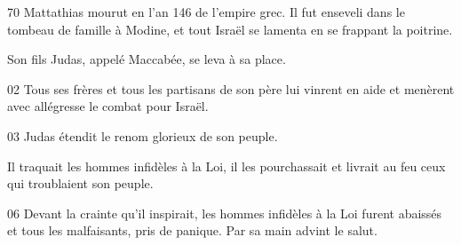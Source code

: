 70 Mattathias mourut en l’an 146 de l’empire grec. Il fut enseveli dans le tombeau de famille à Modine, et tout Israël se lamenta en se frappant la poitrine.

Son fils Judas, appelé Maccabée, se leva à sa place.

02 Tous ses frères et tous les partisans de son père lui vinrent en aide et menèrent avec allégresse le combat pour Israël.

03 Judas étendit le renom glorieux de son peuple. 

Il traquait les hommes infidèles à la Loi, il les pourchassait et livrait au feu ceux qui troublaient son peuple.

06 Devant la crainte qu’il inspirait, les hommes infidèles à la Loi furent abaissés et tous les malfaisants, pris de panique. Par sa main advint le salut.